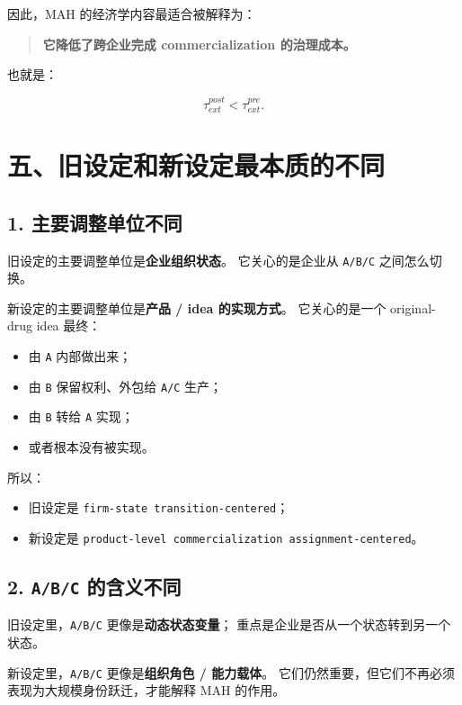 \documentclass[12pt,fontset=none]{ctexart}
\begin{document}
因此，MAH 的经济学内容最适合被解释为：

\begin{quote}
\textbf{它降低了跨企业完成 commercialization 的治理成本。}
\end{quote}

也就是：

\[
\tau_{ext}^{post}<\tau_{ext}^{pre}.
\]

\section{五、旧设定和新设定最本质的不同}

\subsection*{1. 主要调整单位不同}

旧设定的主要调整单位是\textbf{企业组织状态}。
它关心的是企业从 \texttt{A/B/C} 之间怎么切换。

新设定的主要调整单位是\textbf{产品 / idea 的实现方式}。
它关心的是一个 original-drug idea 最终：

\begin{itemize}[leftmargin=2em]
    \item 由 \texttt{A} 内部做出来；
    \item 由 \texttt{B} 保留权利、外包给 \texttt{A/C} 生产；
    \item 由 \texttt{B} 转给 \texttt{A} 实现；
    \item 或者根本没有被实现。
\end{itemize}

所以：

\begin{itemize}[leftmargin=2em]
    \item 旧设定是 \texttt{firm-state transition-centered}；
    \item 新设定是 \texttt{product-level commercialization assignment-centered}。
\end{itemize}

\subsection*{2. \texttt{A/B/C} 的含义不同}

旧设定里，\texttt{A/B/C} 更像是\textbf{动态状态变量}；
重点是企业是否从一个状态转到另一个状态。

新设定里，\texttt{A/B/C} 更像是\textbf{组织角色 / 能力载体}。
它们仍然重要，但它们不再必须表现为大规模身份跃迁，才能解释 MAH 的作用。
\end{document}
